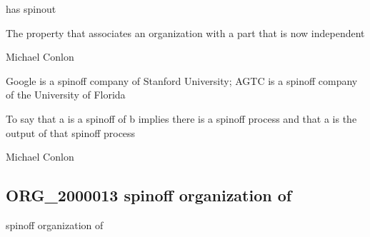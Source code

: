 \documentclass[letterpaper,10pt,english]{sphinxmanual}
\begin{document}
\begin{sphinxShadowBox}

\sphinxAtStartPar
has spinout
\end{sphinxShadowBox}

\begin{sphinxShadowBox}

\sphinxAtStartPar
The property that associates an organization with a part that is now independent
\end{sphinxShadowBox}

\begin{sphinxShadowBox}

\sphinxAtStartPar
Michael Conlon 
\end{sphinxShadowBox}

\begin{sphinxShadowBox}

\sphinxAtStartPar
Google is a spin\sphinxhyphen{}off company of Stanford University; AGTC is a spin\sphinxhyphen{}off company of the University of Florida
\end{sphinxShadowBox}

\begin{sphinxShadowBox}

\sphinxAtStartPar
To say that a is a spin\sphinxhyphen{}off of b implies there is a spin\sphinxhyphen{}off process and that a is the output of that spin\sphinxhyphen{}off process
\end{sphinxShadowBox}

\begin{sphinxShadowBox}

\sphinxAtStartPar
Michael Conlon 
\end{sphinxShadowBox}
\begin{quote}

\ignorespaces \end{quote}


\subsection{ORG\_2000013 \sphinxhyphen{} spin\sphinxhyphen{}off organization of}
\label{\detokenize{doc-ORG_2000013:org-2000013-spin-off-organization-of}}\label{\detokenize{doc-ORG_2000013:index-0}}\label{\detokenize{doc-ORG_2000013::doc}}
\begin{sphinxShadowBox}

\sphinxAtStartPar
spin\sphinxhyphen{}off organization of
\end{sphinxShadowBox}
\end{document}
